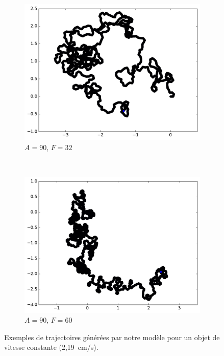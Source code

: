 \begin{appendices}
\begin{figure}[htbp]
\begin{subfigure}[t]{\subImgWmo}
			\includegraphics[width=\textwidth]{figures/ch3/synTraj_219_90_32}
			\caption[$A = 90$, $F=32$]{$A = 90$, $F=32$}
			\label{fig:synTraj_219_90_32}
		\end{subfigure}
		~
		\begin{subfigure}[t]{\subImgWmo}
			\centering
			\includegraphics[width=\textwidth]{figures/ch3/synTraj_219_90_60}
			\caption[$A = 90$, $F=60$]{$A = 90$, $F=60$}
			\label{fig:synTraj_219_90_60}
		\end{subfigure}
		\caption[Mouvements générés par notre modèle -- III]{Exemples de trajectoires générées par notre modèle pour un objet de vitesse constante (2,19~cm/s).}
		\label{fig:motion7590}
	\end{figure}






\end{appendices}
